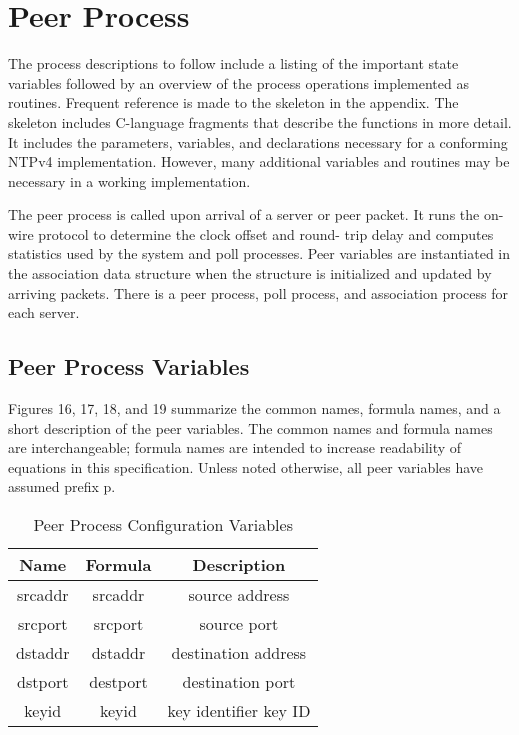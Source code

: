 \chapter{Peer Process}

The process descriptions to follow include a listing of the important
state variables followed by an overview of the process operations
implemented as routines. Frequent reference is made to the skeleton
in the appendix. The skeleton includes C-language fragments that
describe the functions in more detail. It includes the parameters,
variables, and declarations necessary for a conforming NTPv4
implementation. However, many additional variables and routines may
be necessary in a working implementation.

The peer process is called upon arrival of a server or peer packet.
It runs the on-wire protocol to determine the clock offset and round-
trip delay and computes statistics used by the system and poll
processes. Peer variables are instantiated in the association data
structure when the structure is initialized and updated by arriving
packets. There is a peer process, poll process, and association
process for each server.

\section{Peer Process Variables}

Figures 16, 17, 18, and 19 summarize the common names, formula names,
and a short description of the peer variables. The common names and
formula names are interchangeable; formula names are intended to
increase readability of equations in this specification. Unless
noted otherwise, all peer variables have assumed prefix p.

\begin{table}[htb]
\center
\begin{tabular}{c | c | c}
Name & Formula & Description \\
\hline
\hline
srcaddr & srcaddr & source address \\
srcport & srcport & source port \\
dstaddr & dstaddr & destination address \\
dstport & destport & destination port \\
keyid & keyid & key identifier key ID \\
\hline
\end{tabular}
\label{peer_process_configuration_variables}
\caption{Peer Process Configuration Variables}
\end{table}

